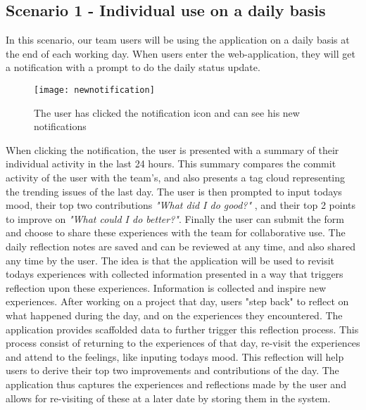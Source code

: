 \subsection{Scenario 1 - Individual use on a daily basis}
\label{scenario1}
In this scenario, our team users will be using the application on a daily basis at the end of each working day.
When users enter the web-application, they will get a notification with a prompt to do the daily status update.

\begin{figure}[h!]
\label{newnotification}
\centering
	\texttt{[image: newnotification]}
\caption{The user has clicked the notification icon and can see his new notifications}
\end{figure}

When clicking the notification, the user is presented with a summary of their individual activity in the last 24 hours.
This summary compares the commit activity of the user with the team's, and also presents a tag cloud representing the trending issues of the last day. The user is then prompted to input todays mood, their top two contributions \emph{"What did I do good?"} , and their top 2 points to improve on \emph{"What could I do better?"}. Finally the user can submit the form and choose to share these experiences with the team for collaborative use. The daily reflection notes are saved and can be reviewed at any time, and also shared any time by the user. The idea is that the application will be used to revisit todays experiences with collected information presented in a way that triggers reflection upon these experiences. Information is collected and inspire new experiences. After working on a project that day, users "step back" to reflect on what happened during the day, and on the experiences they encountered. The application provides scaffolded data to further trigger this reflection process. This process consist of returning to the experiences of that day, re-visit the experiences and attend to the feelings, like inputing todays mood. This reflection will help users to derive their top two improvements and contributions of the day\citep{Krogstie2011}. The application thus captures the experiences and reflections made by the user and allows for re-visiting of these at a later date by storing them in the system. 


